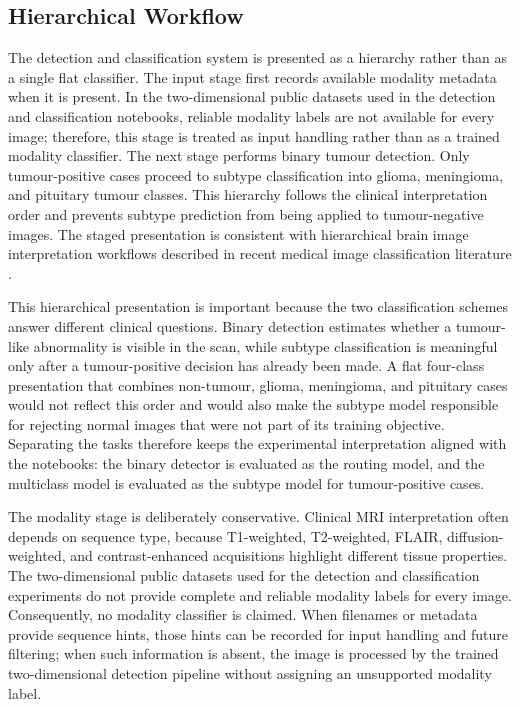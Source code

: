 \documentclass[final,3p,times,number]{elsarticle}
\begin{document}
\subsection{Hierarchical Workflow}

The detection and classification system is presented as a hierarchy rather than as a single flat classifier. The input stage first records available modality metadata when it is present. In the two-dimensional public datasets used in the detection and classification notebooks, reliable modality labels are not available for every image; therefore, this stage is treated as input handling rather than as a trained modality classifier. The next stage performs binary tumour detection. Only tumour-positive cases proceed to subtype classification into glioma, meningioma, and pituitary tumour classes. This hierarchy follows the clinical interpretation order and prevents subtype prediction from being applied to tumour-negative images. The staged presentation is consistent with hierarchical brain image interpretation workflows described in recent medical image classification literature \cite{ref33}.

This hierarchical presentation is important because the two classification schemes answer different clinical questions. Binary detection estimates whether a tumour-like abnormality is visible in the scan, while subtype classification is meaningful only after a tumour-positive decision has already been made. A flat four-class presentation that combines non-tumour, glioma, meningioma, and pituitary cases would not reflect this order and would also make the subtype model responsible for rejecting normal images that were not part of its training objective. Separating the tasks therefore keeps the experimental interpretation aligned with the notebooks: the binary detector is evaluated as the routing model, and the multiclass model is evaluated as the subtype model for tumour-positive cases.

The modality stage is deliberately conservative. Clinical MRI interpretation often depends on sequence type, because T1-weighted, T2-weighted, FLAIR, diffusion-weighted, and contrast-enhanced acquisitions highlight different tissue properties. The two-dimensional public datasets used for the detection and classification experiments do not provide complete and reliable modality labels for every image. Consequently, no modality classifier is claimed. When filenames or metadata provide sequence hints, those hints can be recorded for input handling and future filtering; when such information is absent, the image is processed by the trained two-dimensional detection pipeline without assigning an unsupported modality label.
\end{document}
